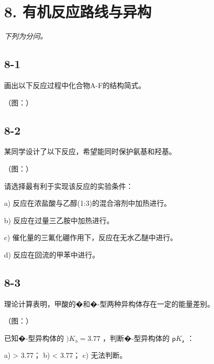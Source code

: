 \section*{8. 有机反应路线与异构}
\textit{下列为分问。}

\subsection*{8-1}
画出以下反应过程中化合物A-F的结构简式。

（图：）

\subsection*{8-2}
某同学设计了以下反应，希望能同时保护氨基和羟基。

（图：）

请选择最有利于实现该反应的实验条件：

a) 反应在浓盐酸与⼄醇(1:3)的混合溶剂中加热进⾏。

b) 反应在过量三⼄胺中加热进⾏。

c) 催化量的三氟化硼作⽤下，反应在⽆⽔⼄醚中进⾏。

d) 反应在回流的甲苯中进⾏。

\subsection*{8-3}
理论计算表明，甲酸的�和�-型两种异构体存在⼀定的能量差别。

（图：）

已知�-型异构体的 $) K _ { \mathrm { a } } = 3 . 7 7$ ，判断�-型异构体的 $\mathsf { p } K _ { \mathsf { a } }$ ：

a) > 3.77； b) < 3.77； c) ⽆法判断。
